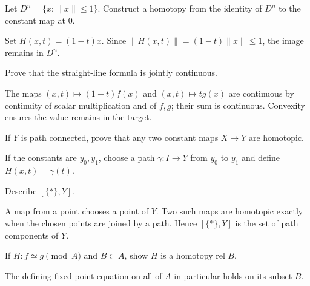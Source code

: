 \begin{problem}\label{prob:viii01-02}
Let \(D^n=\{x:\|x\|\le1\}\).  Construct a homotopy from the identity of \(D^n\)
to the constant map at \(0\).
\end{problem}
\begin{solution}
Set \(H(x,t)=(1-t)x\).  Since
\(\|H(x,t)\|=(1-t)\|x\|\le1\), the image remains in \(D^n\).
\end{solution}

\begin{problem}\label{prob:viii01-03}
Prove that the straight-line formula is jointly continuous.
\end{problem}
\begin{solution}
The maps \((x,t)\mapsto (1-t)f(x)\) and \((x,t)\mapsto tg(x)\) are continuous
by continuity of scalar multiplication and of \(f,g\); their sum is continuous.
Convexity ensures the value remains in the target.
\end{solution}

\begin{problem}\label{prob:viii01-04}
If \(Y\) is path connected, prove that any two constant maps \(X\to Y\) are
homotopic.
\end{problem}
\begin{solution}
If the constants are \(y_0,y_1\), choose a path \(\gamma:I\to Y\) from
\(y_0\) to \(y_1\) and define \(H(x,t)=\gamma(t)\).
\end{solution}

\begin{problem}\label{prob:viii01-05}
Describe \([\{*\},Y]\).
\end{problem}
\begin{solution}
A map from a point chooses a point of \(Y\).  Two such maps are homotopic
exactly when the chosen points are joined by a path.  Hence
\([\{*\},Y]\) is the set of path components of \(Y\).
\end{solution}

\begin{problem}\label{prob:viii01-06}
If \(H:f\simeq g\pmod A\) and \(B\subset A\), show \(H\) is a homotopy rel \(B\).
\end{problem}
\begin{solution}
The defining fixed-point equation on all of \(A\) in particular holds on its
subset \(B\).
\end{solution}

